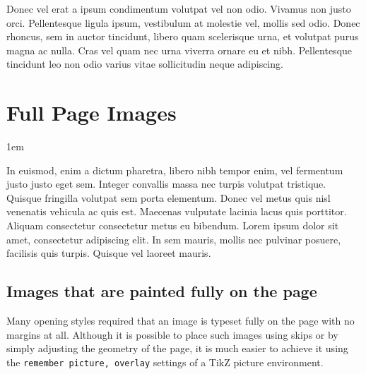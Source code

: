 Donec vel erat a ipsum condimentum volutpat vel non odio. Vivamus non justo orci. Pellentesque ligula ipsum, vestibulum at molestie vel, mollis sed odio. Donec rhoncus, sem in auctor tincidunt, libero quam scelerisque urna, et volutpat purus magna ac nulla. Cras vel quam nec urna viverra ornare eu et nibh. Pellentesque tincidunt leo non odio varius vitae sollicitudin neque adipiscing. 

\section{Full Page Images}

\parindent1em

In euismod, enim a dictum pharetra, libero nibh tempor enim, vel fermentum justo justo eget sem. Integer convallis massa nec turpis volutpat tristique. Quisque fringilla volutpat sem porta elementum. Donec vel metus quis nisl venenatis vehicula ac quis est. Maecenas vulputate lacinia lacus quis porttitor. Aliquam consectetur consectetur metus eu bibendum. Lorem ipsum dolor sit amet, consectetur adipiscing elit. In sem mauris, mollis nec pulvinar posuere, facilisis quis turpis. Quisque vel laoreet mauris.

\subsection{Images that are painted fully on the page}

Many opening styles required that an image is typeset fully on the page with no margins at all. Although
it is possible to place such images using skips or by simply adjusting the geometry of the page, it is much
easier to achieve it using the \texttt{remember picture, overlay} settings of a TikZ picture environment.

